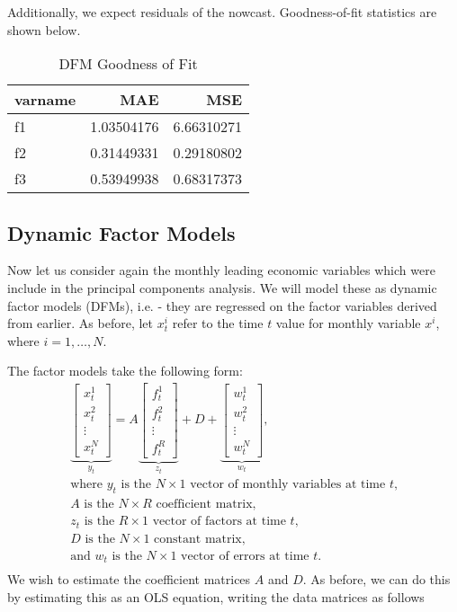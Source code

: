 \documentclass[11pt, letterpaper]{article}\usepackage[]{graphicx}\usepackage[]{color}
\begin{document}
Additionally, we expect residuals of the nowcast. Goodness-of-fit statistics are shown below.
\begin{table}[H]
\centering
\begingroup\footnotesize
\begin{tabular}{lrr}
  \hline
varname & MAE & MSE \\ 
  \hline
f1 & 1.03504176 & 6.66310271 \\ 
  f2 & 0.31449331 & 0.29180802 \\ 
  f3 & 0.53949938 & 0.68317373 \\ 
   \hline
\end{tabular}
\endgroup
\caption{DFM Goodness of Fit} 
\end{table}




\subsection{Dynamic Factor Models}
Now let us consider again the monthly leading economic variables which were include in the principal components analysis. We will model these as dynamic factor models (DFMs), i.e. - they are regressed on the factor variables derived from earlier. As before, let $x^i_t$ refer to the time $t$ value for monthly variable $x^i$, where $i = 1, \dots, N$.

The factor models take the following form:
\begin{align*}
\underbrace{\begin{bmatrix}
	x^1_t\\
	x^2_t\\
	\vdots \\
	x^N_t
\end{bmatrix}}_{y_t}
=
A
\underbrace{\begin{bmatrix}
	f^1_{t}\\
	f^2_{t}\\
	\vdots \\
	f^R_{t}
\end{bmatrix}}_{z_t}
+
D 
+
\underbrace{\begin{bmatrix}
	w^1_t\\
	w^2_t\\
	\vdots\\
	w^N_t
\end{bmatrix}}_{w_t},\\
\text{where $y_t$ is the $N \times 1$ vector of monthly variables at time $t$,}\\
\text{$A$ is the $N \times R$ coefficient matrix,}\\
\text{$z_t$ is the $R \times 1$ vector of factors at time $t$,}\\
\text{$D$ is the $N \times 1$ constant matrix,}\\
\text{and $w_t$ is the $N \times 1$ vector of errors at time $t$.}\\
\end{align*}
We wish to estimate the coefficient matrices $A$ and $D$. As before, we can do this by estimating this as an OLS equation, writing the data matrices as follows
\end{document}
